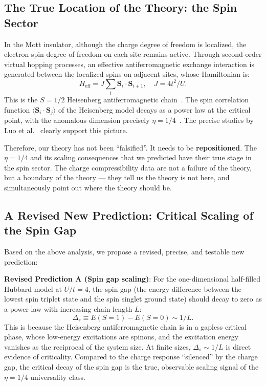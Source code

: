 \documentclass[prb,reprint,twocolumn,superscriptaddress]{revtex4-2}
\begin{document}
\subsection{The True Location of the Theory: the Spin Sector}

In the Mott insulator, although the charge degree of freedom is localized, the electron spin degree of freedom on each site remains active. Through second-order virtual hopping processes, an effective antiferromagnetic exchange interaction is generated between the localized spins on adjacent sites, whose Hamiltonian is:
\begin{equation}
H_{\mathrm{eff}} = J \sum_i \mathbf{S}_i \cdot \mathbf{S}_{i+1}, \quad J = 4t^2/U.
\end{equation}
This is the $S = 1/2$ Heisenberg antiferromagnetic chain~\cite{Affleck1989,Giamarchi2004}. The spin correlation function $\langle \mathbf{S}_i \cdot \mathbf{S}_j \rangle$ of the Heisenberg model decays as a power law at the critical point, with the anomalous dimension precisely $\eta = 1/4$~\cite{Schulz1990}. The precise studies by Luo et al.~\cite{Luo2023,Luo2024} clearly support this picture.

Therefore, our theory has not been ``falsified''. It needs to be \textbf{repositioned}. The $\eta = 1/4$ and its scaling consequences that we predicted have their true stage in the spin sector. The charge compressibility data are not a failure of the theory, but a boundary of the theory --- they tell us the theory is not here, and simultaneously point out where the theory should be.

\subsection{A Revised New Prediction: Critical Scaling of the Spin Gap}

Based on the above analysis, we propose a revised, precise, and testable new prediction:

\textbf{Revised Prediction A (Spin gap scaling)}: For the one-dimensional half-filled Hubbard model at $U/t = 4$, the spin gap (the energy difference between the lowest spin triplet state and the spin singlet ground state) should decay to zero as a power law with increasing chain length $L$:
\begin{equation}
\Delta_s \equiv E(S=1) - E(S=0) \sim 1/L.
\end{equation}
This is because the Heisenberg antiferromagnetic chain is in a gapless critical phase, whose low-energy excitations are spinons, and the excitation energy vanishes as the reciprocal of the system size. At finite sizes, $\Delta_s \sim 1/L$ is direct evidence of criticality. Compared to the charge response ``silenced'' by the charge gap, the critical decay of the spin gap is the true, observable scaling signal of the $\eta = 1/4$ universality class.
\end{document}
